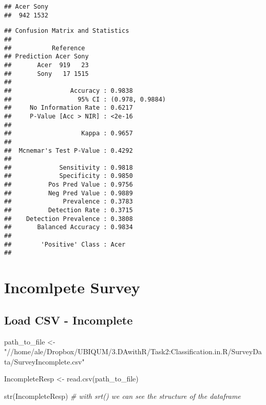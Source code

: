 \documentclass[
]{article}
\newenvironment{Shaded}{\begin{snugshade}}{\end{snugshade}}
\newcommand{\CommentTok}[1]{\textcolor[rgb]{0.56,0.35,0.01}{\textit{#1}}}
\newcommand{\FunctionTok}[1]{\textcolor[rgb]{0.00,0.00,0.00}{#1}}
\newcommand{\NormalTok}[1]{#1}
\newcommand{\OtherTok}[1]{\textcolor[rgb]{0.56,0.35,0.01}{#1}}
\newcommand{\SpecialCharTok}[1]{\textcolor[rgb]{0.00,0.00,0.00}{#1}}
\newcommand{\StringTok}[1]{\textcolor[rgb]{0.31,0.60,0.02}{#1}}
\begin{document}
\begin{verbatim}
## Acer Sony 
##  942 1532
\end{verbatim}

\begin{Shaded}
\end{Shaded}

\begin{verbatim}
## Confusion Matrix and Statistics
## 
##           Reference
## Prediction Acer Sony
##       Acer  919   23
##       Sony   17 1515
##                                          
##                Accuracy : 0.9838         
##                  95% CI : (0.978, 0.9884)
##     No Information Rate : 0.6217         
##     P-Value [Acc > NIR] : <2e-16         
##                                          
##                   Kappa : 0.9657         
##                                          
##  Mcnemar's Test P-Value : 0.4292         
##                                          
##             Sensitivity : 0.9818         
##             Specificity : 0.9850         
##          Pos Pred Value : 0.9756         
##          Neg Pred Value : 0.9889         
##              Prevalence : 0.3783         
##          Detection Rate : 0.3715         
##    Detection Prevalence : 0.3808         
##       Balanced Accuracy : 0.9834         
##                                          
##        'Positive' Class : Acer           
## 
\end{verbatim}

\hypertarget{incomlpete-survey}{%
\section{Incomlpete Survey}\label{incomlpete-survey}}

\hypertarget{load-csv---incomplete}{%
\subsection{Load CSV - Incomplete}\label{load-csv---incomplete}}

\begin{Shaded}
\begin{Highlighting}[]
\NormalTok{path\_to\_file }\OtherTok{\textless{}{-}} \StringTok{"//home/ale/Dropbox/UBIQUM/3.DAwithR/Task2:Classification.in.R/SurveyData/SurveyIncomplete.csv"}

\NormalTok{IncompleteResp }\OtherTok{\textless{}{-}} \FunctionTok{read.csv}\NormalTok{(path\_to\_file)}

\FunctionTok{str}\NormalTok{(IncompleteResp) }\CommentTok{\# with srt() we can see the structure of the dataframe}
\end{Highlighting}
\end{Shaded}
\end{document}
